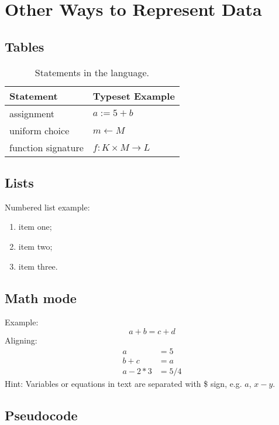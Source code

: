 \section{Other Ways to Represent Data}

\subsection{Tables}

\begin{table}[h]
\centering
\caption{Statements in the \proveit language.}
\begin{tabular}{ll}
	\toprule
	Statement & Typeset Example \\
	\midrule
	assignment & $a := 5 + b$ \\
	uniform choice & $m \gets M$ \\
	function signature & $f : K \times M \to L$ \\
	\bottomrule
\end{tabular}
\label{tab:statements}
\end{table}


\subsection{Lists}

Numbered list example:
\begin{enumerate}
	\item item one;
	\item item two;
	\item item three.
\end{enumerate}

\subsection{Math mode}
Example:
\begin{equation}
a + b = c + d
\end{equation}
Aligning:
\begin{align*}
	a &= 5 \\
	b + c &= a \\
	a -2*3 &= 5/4
\end{align*}
Hint: Variables or equations in text are separated with \$ sign, e.g. $a$, $x - y$.

\subsection{Pseudocode}

